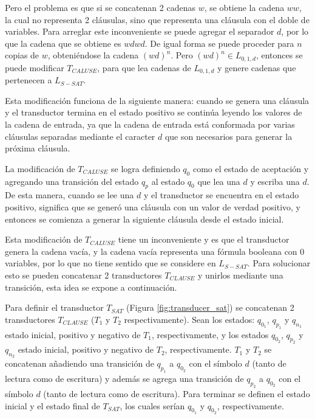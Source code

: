 \documentclass[12pt]{article}
\begin{document}
Pero el problema es que si se concatenan 2 cadenas $w$, se obtiene la cadena $ww$, la cual no representa 2 cláusulas,
sino que representa una cláusula con el doble de variables. Para arreglar este inconveniente se puede agregar el separador
$d$, por lo que la cadena que se obtiene es $wdwd$. De igual forma se puede proceder para $n$ copias de $w$, obteniéndose
la cadena $(wd)^n$. Pero $(wd)^n\in L_{0,1,d}$, entonces se puede modificar $T_{CALUSE}$, para que lea cadenas de $L_{0,1,d}$ y genere cadenas que pertenecen a $L_{S-SAT}$.

Esta modificación funciona de la siguiente manera: 
cuando se genera una cláusula y el transductor termina en el estado positivo se continúa leyendo los valores de la cadena de entrada, ya que la cadena de entrada está conformada por varias cláusulas separadas mediante el caracter $d$ que son necesarios para generar la próxima cláusula.

La modificación de $T_{CALUSE}$ se logra definiendo $q_0$ como el estado de aceptación y agregando una 
transición del estado $q_p$ al estado $q_0$ que lea una $d$ y escriba una $d$. De esta manera, cuando se lee una $d$ y el transductor se encuentra en el estado positivo, significa
que se generó una cláusula con un valor de verdad positivo, y entonces se comienza a generar la siguiente cláusula desde el estado inicial. 

Esta modificación de $T_{CALUSE}$ tiene un inconveniente y es que el transductor genera la cadena vacía, y la cadena vacía representa una fórmula booleana con 0 variables, por lo que no tiene sentido que se considere en $L_{S-SAT}$. Para solucionar esto se pueden concatenar 2 transductores $T_{CLAUSE}$ y unirlos mediante una transición, esta idea se expone a continuación.

Para definir el transductor $T_{SAT}$ (Figura \ref{fig:transducer_sat}) se concatenan 2 transductores $T_{CLAUSE}$ ($T_1$ y $T_2$ respectivamente). Sean los estados: $q_{0_1}$, $q_{p_1}$ y $q_{n_1}$ estado inicial, positivo y negativo de $T_1$, respectivamente, y los estados $q_{0_2}$, $q_{p_2}$ y $q_{n_2}$ estado inicial, positivo y negativo de $T_2$, respectivamente. $T_1$ y $T_2$ se concatenan añadiendo una transición de $q_{p_1}$ a $q_{0_2}$ con el símbolo $d$ (tanto de lectura como de escritura) y además se agrega una transición de $q_{p_2}$ a $q_{0_2}$ con el símbolo $d$ (tanto de lectura como de escritura).  Para terminar se definen el estado inicial y el estado final de $T_{SAT}$, los cuales serían $q_{0_1}$ y $q_{0_2}$, respectivamente.
\end{document}
